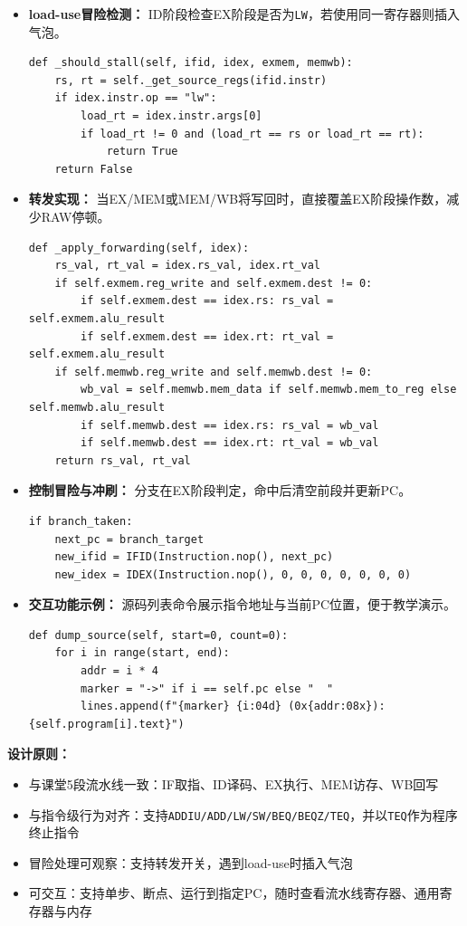 \documentclass[12pt,a4paper]{ctexart}
\begin{document}
\begin{itemize}
\begin{lstlisting}
	# MEM -> new_memwb, EX -> new_exmem, ID -> new_idex, IF -> new_ifid
	self.ifid, self.idex = new_ifid, new_idex
	self.exmem, self.memwb = new_exmem, new_memwb
\end{lstlisting}
	\item \textbf{load-use冒险检测：} ID阶段检查EX阶段是否为\texttt{LW}，若使用同一寄存器则插入气泡。
\begin{lstlisting}
def _should_stall(self, ifid, idex, exmem, memwb):
	rs, rt = self._get_source_regs(ifid.instr)
	if idex.instr.op == "lw":
		load_rt = idex.instr.args[0]
		if load_rt != 0 and (load_rt == rs or load_rt == rt):
			return True
	return False
\end{lstlisting}
	\item \textbf{转发实现：} 当EX/MEM或MEM/WB将写回时，直接覆盖EX阶段操作数，减少RAW停顿。
\begin{lstlisting}
def _apply_forwarding(self, idex):
	rs_val, rt_val = idex.rs_val, idex.rt_val
	if self.exmem.reg_write and self.exmem.dest != 0:
		if self.exmem.dest == idex.rs: rs_val = self.exmem.alu_result
		if self.exmem.dest == idex.rt: rt_val = self.exmem.alu_result
	if self.memwb.reg_write and self.memwb.dest != 0:
		wb_val = self.memwb.mem_data if self.memwb.mem_to_reg else self.memwb.alu_result
		if self.memwb.dest == idex.rs: rs_val = wb_val
		if self.memwb.dest == idex.rt: rt_val = wb_val
	return rs_val, rt_val
\end{lstlisting}
	\item \textbf{控制冒险与冲刷：} 分支在EX阶段判定，命中后清空前段并更新PC。
\begin{lstlisting}
if branch_taken:
	next_pc = branch_target
	new_ifid = IFID(Instruction.nop(), next_pc)
	new_idex = IDEX(Instruction.nop(), 0, 0, 0, 0, 0, 0, 0)
\end{lstlisting}
	\item \textbf{交互功能示例：} 源码列表命令展示指令地址与当前PC位置，便于教学演示。
\begin{lstlisting}
def dump_source(self, start=0, count=0):
	for i in range(start, end):
		addr = i * 4
		marker = "->" if i == self.pc else "  "
		lines.append(f"{marker} {i:04d} (0x{addr:08x}): {self.program[i].text}")
\end{lstlisting}
\end{itemize}

\textbf{设计原则：}
\begin{itemize}
	\item 与课堂5段流水线一致：IF取指、ID译码、EX执行、MEM访存、WB回写
	\item 与指令级行为对齐：支持\texttt{ADDIU/ADD/LW/SW/BEQ/BEQZ/TEQ}，并以\texttt{TEQ}作为程序终止指令
	\item 冒险处理可观察：支持转发开关，遇到load-use时插入气泡
	\item 可交互：支持单步、断点、运行到指定PC，随时查看流水线寄存器、通用寄存器与内存
\end{itemize}
\end{document}
